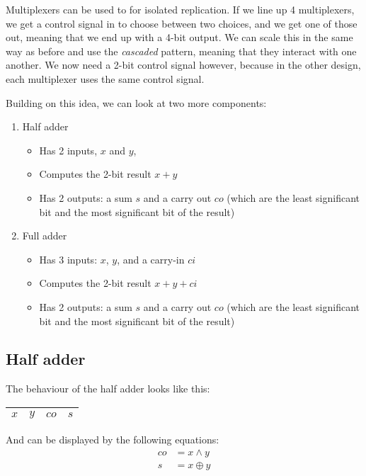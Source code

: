 \documentclass[11pt,a4paper,titlepage,dvipsnames,cmyk]{scrartcl}
\begin{document}
Multiplexers can be used to for isolated replication. If we line up 4
multiplexers, we get a control signal in to choose between two choices,
and we get one of those out, meaning that we end up with a 4-bit output.
We can scale this in the same way as before and use the \textit{cascaded}
pattern, meaning that they interact with one another. We now need a 2-bit
control signal however, because in the other design, each multiplexer uses
the same control signal.

Building on this idea, we can look at two more components:
\begin{enumerate}
    \item Half adder
        \begin{itemize}
            \item Has 2 inputs, $x$ and $y$,
            \item Computes the 2-bit result $x + y$
            \item Has 2 outputs: a sum $s$ and a carry out $co$ (which are
                the least significant bit and the most significant bit of
                the result)
        \end{itemize}
    \item Full adder
        \begin{itemize}
            \item Has 3 inputs: $x$, $y$, and a carry-in $ci$
            \item Computes the 2-bit result $x + y + ci$
            \item Has 2 outputs: a sum $s$ and a carry out $co$ (which are
                the least significant bit and the most significant bit of
                the result)
        \end{itemize}
\end{enumerate}

\subsection{Half adder}%
\label{sub:half}
The behaviour of the half adder looks like this:
\begin{center}
    \begin{tabular}{|c c|c|c|}
        \hline
        $x$ & $y$ & $co$ & $s$ \\ \hline
    \end{tabular}
\end{center}

And can be displayed by the following equations:
\begin{align*}
    co &= x \wedge y \\
    s &= x \oplus y
\end{align*}
\end{document}
